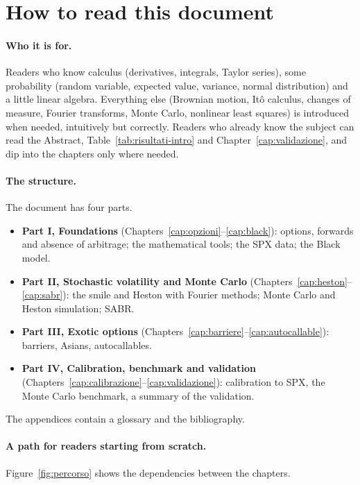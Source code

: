 \section*{How to read this document}
\paragraph{Who it is for.} Readers who know calculus (derivatives, integrals, Taylor series), some probability
(random variable, expected value, variance, normal distribution) and a little linear algebra. Everything else
(Brownian motion, Itô calculus, changes of measure, Fourier transforms, Monte Carlo, nonlinear least squares) is
introduced when needed, intuitively but correctly. Readers who already know the subject can read the Abstract,
Table~\ref{tab:risultati-intro} and Chapter~\ref{cap:validazione}, and dip into the chapters only where needed.

\paragraph{The structure.} The document has four parts.

\begin{itemize}
\item \textbf{Part I, Foundations} (Chapters~\ref{cap:opzioni}--\ref{cap:black}): options, forwards and absence of
arbitrage; the mathematical tools; the SPX data; the Black model.
\item \textbf{Part II, Stochastic volatility and Monte Carlo} (Chapters~\ref{cap:heston}--\ref{cap:sabr}): the
smile and Heston with Fourier methods; Monte Carlo and Heston simulation; SABR.
\item \textbf{Part III, Exotic options} (Chapters~\ref{cap:barriere}--\ref{cap:autocallable}): barriers, Asians,
autocallables.
\item \textbf{Part IV, Calibration, benchmark and validation}
(Chapters~\ref{cap:calibrazione}--\ref{cap:validazione}): calibration to SPX, the Monte Carlo benchmark, a summary of
the validation.
\end{itemize}

The appendices contain a glossary and the bibliography.

\paragraph{A path for readers starting from scratch.} Figure~\ref{fig:percorso} shows the dependencies between the
chapters.

